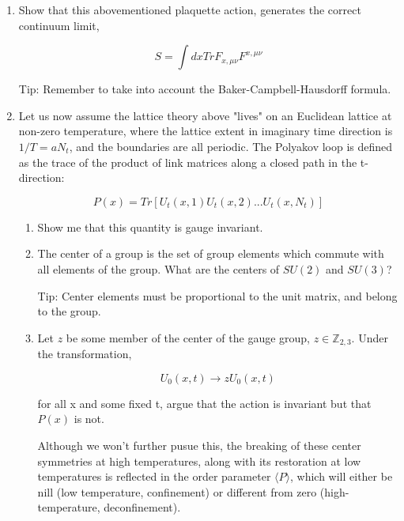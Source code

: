 \documentclass{article}
\begin{document}
\begin{enumerate}

\item Show that this abovementioned plaquette action, generates the correct continuum limit,

\begin{equation}
S = \int dx Tr F_{x,\mu\nu} F^{x,\mu \nu}
\end{equation}

Tip: Remember to take into account the Baker-Campbell-Hausdorff formula.

\item Let us now assume the lattice theory above "lives" on an Euclidean lattice at non-zero temperature, where the lattice extent in imaginary time direction is $1/T = aN_t$, and the boundaries are all periodic. The Polyakov loop is defined as the trace of the product of link matrices along a closed path in the t-direction:

\begin{equation}
P(x) = Tr [ U_t(x,1) U_t(x,2)...U_t(x,N_t)  ]
\end{equation} 

\begin{enumerate}
\item Show me that this quantity is gauge invariant.

\item The center of a group is the set of group elements which commute with all elements of the group. What are the centers of $SU(2)$ and $SU(3)$? 

Tip: Center elements must be proportional to the unit matrix, and belong to the group.

\item Let $z$ be some member of the center of the gauge group, $z \in \mathbb{Z}_{2,3}$. Under the transformation,

\begin{equation}
U_0(x,t) \rightarrow zU_0(x,t)
\end{equation} 

for all x and some fixed t, argue that the action is invariant but that $P(x)$ is not. 

Although we won't further pusue this, the breaking of these center symmetries at high temperatures, along with its restoration at low temperatures is reflected in the order parameter $\langle P \rangle$, which will either be nill (low temperature, confinement) or different from zero (high-temperature, deconfinement).

\end{enumerate}

\end{enumerate}
\end{document}
